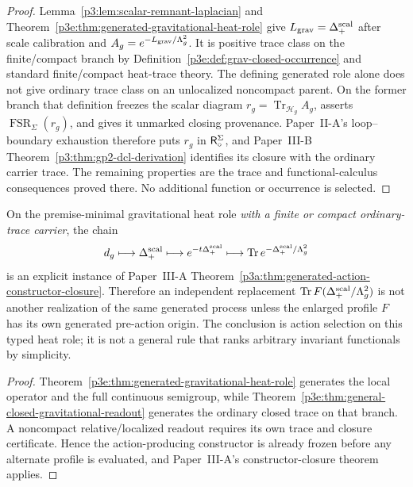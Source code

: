 \documentclass[12pt,a4paper]{article}
\begin{document}
\begin{proof}
Lemma~\ref{p3:lem:scalar-remnant-laplacian} and
Theorem~\ref{p3e:thm:generated-gravitational-heat-role} give
\(L_{\rm grav}=\Delta_+^{\rm scal}\) after scale calibration and
\(A_g=e^{-L_{\rm grav}/\Lambda_g^2}\).  It is positive trace class on the finite/compact branch by
Definition~\ref{p3e:def:grav-closed-occurrence} and standard finite/compact
heat-trace theory.  The defining generated role alone does not give ordinary
trace class on an unlocalized noncompact parent.  On the former branch
that definition freezes
the scalar diagram \(r_g=\operatorname{Tr}_{\mathcal H_g}A_g\), asserts
\(\operatorname{FSR}_{\Sigma}(r_g)\), and gives it unmarked closing
provenance.  Paper~II-A's loop--boundary exhaustion therefore puts \(r_g\)
in \(\mathsf R_{\circ}^{\Sigma}\), and Paper~III-B
Theorem~\ref{p3:thm:gp2-dcl-derivation} identifies its closure with the
ordinary carrier trace.
The remaining properties are the trace and functional-calculus consequences
proved there.  No additional function or occurrence is selected.
\end{proof}

\begin{corollary}
\label{p3e:cor:native-heat-action-constructor}
On the premise-minimal gravitational heat role \emph{with a finite or
compact ordinary-trace carrier}, the chain
\[
 d_g\longmapsto\Delta_+^{\rm scal}
 \longmapsto e^{-t\Delta_+^{\rm scal}}
 \longmapsto
 \operatorname{Tr}e^{-\Delta_+^{\rm scal}/\Lambda_g^2}
\]
is an explicit instance of Paper~III-A
Theorem~\ref{p3a:thm:generated-action-constructor-closure}.  Therefore an
independent replacement
$\operatorname{Tr}F(\Delta_+^{\rm scal}/\Lambda_g^2)$ is not another
realization of the same generated process unless the enlarged profile $F$ has
its own generated pre-action origin.  The conclusion is action selection on
this typed heat role; it is not a general rule that ranks arbitrary invariant
functionals by simplicity.
\end{corollary}

\begin{proof}
Theorem~\ref{p3e:thm:generated-gravitational-heat-role} generates the local
operator and the full continuous semigroup, while
Theorem~\ref{p3e:thm:general-closed-gravitational-readout} generates the ordinary closed trace on that branch.  A noncompact
relative/localized readout requires its own trace and closure certificate.
Hence the action-producing constructor is already
frozen before any alternate profile is evaluated, and Paper~III-A's
constructor-closure theorem applies.
\end{proof}
\end{document}
